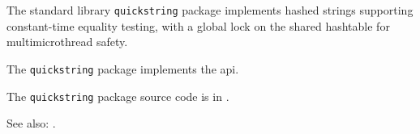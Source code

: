
The standard library {\tt quickstring} package implements hashed strings supporting 
constant-time equality testing, with a global lock on the shared hashtable for multimicrothread safety.

The {\tt quickstring} package implements the  api.

The {\tt quickstring} package source code is in .

See also:  .

